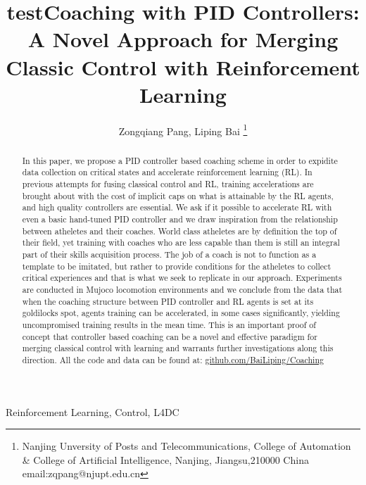 \documentclass[journal]{IEEEtran}
\begin{document}
    \title{test}
\title{Coaching with PID Controllers: A Novel Approach for Merging Classic Control with Reinforcement Learning}

\author{ Zongqiang Pang, Liping Bai \thanks{Nanjing Unversity of Posts and Telecommunications, College of Automation \& College of Artificial Intelligence, Nanjing, Jiangsu,210000 China email:zqpang@njupt.edu.cn}}
\maketitle
\begin{abstract}
In this paper, we propose a PID controller based coaching scheme in order to expidite data collection on critical states and accelerate reinforcement learning (RL). In previous attempts for fusing classical control and RL, training accelerations are brought about with the cost of implicit caps on what is attainable by the RL agents, and high quality controllers are essential. We ask if it possible to accelerate RL with even a basic hand-tuned PID controller and we draw inspiration from the relationship between atheletes and their coaches. World class atheletes are by definition the top of their field, yet training with coaches who are less capable than them is still an integral part of their skills acquisition process. The job of a coach is not to function as a template to be imitated, but rather to provide conditions for the atheletes to collect critical experiences and that is what we seek to replicate in our approach. Experiments are conducted in Mujoco locomotion environments and we conclude from the data that when the coaching structure between PID controller and RL agents is set at its goldilocks spot, agents training can be accelerated, in some cases significantly, yielding uncompromised training results in the mean time. This is an important proof of concept that controller based coaching can be a novel and effective paradigm for merging classical control with learning and warrants further investigations along this direction. All the code and data can be found at: \href{https://github.com/BaiLiping/Coaching}{github.com/BaiLiping/Coaching}
\end{abstract}
\begin{IEEEkeywords}
Reinforcement Learning, Control, L4DC
\end{IEEEkeywords}
\IEEEpeerreviewmaketitle
\end{document}

